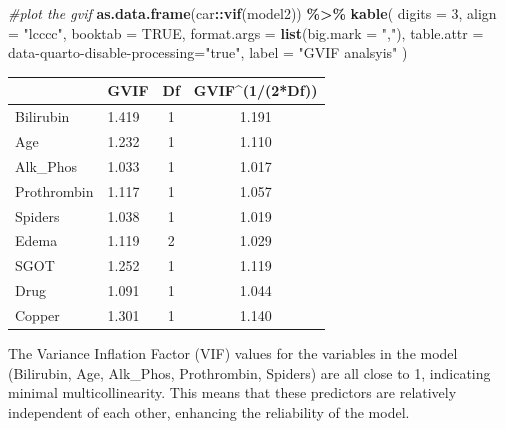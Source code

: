 \documentclass[
]{article}
\newenvironment{Shaded}{\begin{snugshade}}{\end{snugshade}}
\newcommand{\AttributeTok}[1]{\textcolor[rgb]{0.13,0.29,0.53}{#1}}
\newcommand{\CommentTok}[1]{\textcolor[rgb]{0.56,0.35,0.01}{\textit{#1}}}
\newcommand{\ConstantTok}[1]{\textcolor[rgb]{0.56,0.35,0.01}{#1}}
\newcommand{\DecValTok}[1]{\textcolor[rgb]{0.00,0.00,0.81}{#1}}
\newcommand{\FunctionTok}[1]{\textcolor[rgb]{0.13,0.29,0.53}{\textbf{#1}}}
\newcommand{\NormalTok}[1]{#1}
\newcommand{\SpecialCharTok}[1]{\textcolor[rgb]{0.81,0.36,0.00}{\textbf{#1}}}
\newcommand{\StringTok}[1]{\textcolor[rgb]{0.31,0.60,0.02}{#1}}
\begin{document}
\begin{Shaded}
\begin{Highlighting}[]
\CommentTok{\#plot the gvif}
\FunctionTok{as.data.frame}\NormalTok{(car}\SpecialCharTok{::}\FunctionTok{vif}\NormalTok{(model2)) }\SpecialCharTok{\%\textgreater{}\%}
  \FunctionTok{kable}\NormalTok{(}
    \AttributeTok{digits =} \DecValTok{3}\NormalTok{,}
    \AttributeTok{align =} \StringTok{"lcccc"}\NormalTok{,}
    \AttributeTok{booktab =} \ConstantTok{TRUE}\NormalTok{,}
    \AttributeTok{format.args =} \FunctionTok{list}\NormalTok{(}\AttributeTok{big.mark =} \StringTok{","}\NormalTok{),}
    \AttributeTok{table.attr =} \StringTok{\textquotesingle{}data{-}quarto{-}disable{-}processing="true"\textquotesingle{}}\NormalTok{,}
    \AttributeTok{label =} \StringTok{"GVIF analsyis"}
\NormalTok{  )}
\end{Highlighting}
\end{Shaded}

\begin{tabular}{llcc}
\toprule
  & GVIF & Df & GVIF\textasciicircum{}(1/(2*Df))\\
\midrule
Bilirubin & 1.419 & 1 & 1.191\\
Age & 1.232 & 1 & 1.110\\
Alk\_Phos & 1.033 & 1 & 1.017\\
Prothrombin & 1.117 & 1 & 1.057\\
Spiders & 1.038 & 1 & 1.019\\
\addlinespace
Edema & 1.119 & 2 & 1.029\\
SGOT & 1.252 & 1 & 1.119\\
Drug & 1.091 & 1 & 1.044\\
Copper & 1.301 & 1 & 1.140\\
\bottomrule
\end{tabular}

The Variance Inflation Factor (VIF) values for the variables in the
model (Bilirubin, Age, Alk\_Phos, Prothrombin, Spiders) are all close to
1, indicating minimal multicollinearity. This means that these
predictors are relatively independent of each other, enhancing the
reliability of the model.
\end{document}
